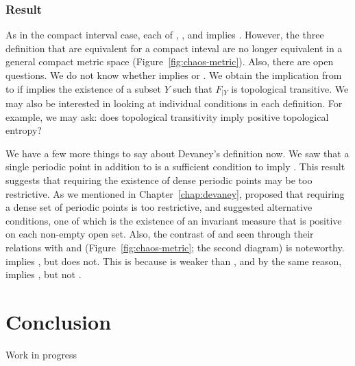 \documentclass[10pt,twoside,draft]{book}
\begin{document}
\subsubsection*{Result}
As in the compact interval case, each of \dev, \blcp, and \pte implies \liy.
However, the three definition that are equivalent for a compact inteval are no longer equivalent in a general compact metric space (Figure~\ref{fig:chaos-metric}).
Also, there are open questions.
We do not know whether \pte implies \blcp or \dev.
We obtain the implication from \pte to \wig if \pte implies the existence of a subset $Y$ such that $F_{|Y}$ is topological transitive.
We may also be interested in looking at individual conditions in each definition.
For example, we may ask: does topological transitivity imply positive topological entropy?

We have a few more things to say about Devaney's definition now.
We saw that a single periodic point in addition to \wig is a sufficient condition to imply \liy. 
This result suggests that requiring the existence of dense periodic points may be too restrictive.
As we mentioned in Chapter~\ref{chap:devaney}, \citet{glasner} proposed that requiring a dense set of periodic points is too restrictive, and suggested alternative conditions, one of which is the existence of an invariant measure that is positive on each non-empty open set.
Also, the contrast of \dev and \wig seen through their relations with \pte and \liy (Figure~\ref{fig:chaos-metric}; the second diagram) is noteworthy.
\dev implies \liy, but \wig does not.
This is because \wig is weaker than \dev, and by the same reason, \blcp implies \wig, but not \dev.




\printindex

\section{Conclusion}
Work in progress
%
\end{document}
